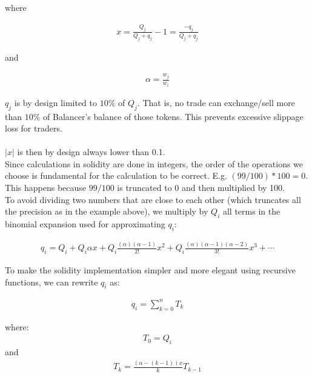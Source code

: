 \documentclass[11pt]{amsart}
\begin{document}
where 

\begin{equation}
\begin{gathered}
x = \frac{Q_j}{Q_j+q_j} - 1 = \frac{-q_j}{Q_j+q_j}
\end{gathered}
\end{equation}

and

\begin{equation}
\begin{gathered}
\alpha = \frac{w_j}{w_i}
\end{gathered}
\end{equation}

$q_j$ is by design limited to $10\%$ of $Q_j$. That is, no trade can exchange/sell more than $10\%$ of Balancer's balance of those tokens. This prevents excessive slippage loss for traders.
\\
\\
$|x|$ is then by design always lower than 0.1.
\\

Since calculations in solidity are done in integers, the order of the operations we choose is fundamental for the calculation to be correct. E.g. $(99/100)*100 = 0$. This happens because $99/100$ is truncated to 0 and then multiplied by 100.
\\

To avoid dividing two numbers that are close to each other (which truncates all the precision as in the example above), we multiply by $Q_i$ all terms in the binomial expansion used for approximating $q_i$:


\begin{equation}
\begin{gathered}
q_i=Q_i+Q_i\alpha x+
Q_i\frac{(\alpha)(\alpha-1)}{2!}x^2+
Q_i\frac{(\alpha)(\alpha-1)(\alpha-2)}{3!}x^3+
\cdots 
\end{gathered}
\end{equation}

To make the solidity implementation simpler and more elegant using recursive functions, we can rewrite $q_i$ as:

\begin{equation}
\begin{gathered}
q_i = \sum_{k=0}^{n}T_k
\end{gathered}
\end{equation}


where:
\begin{equation}
\begin{gathered}
T_0 = Q_i
\end{gathered}
\end{equation}
and
\begin{equation}
\begin{gathered}
T_k = \frac{\left(\alpha-(k-1)\right)x}{k} T_{k-1}
\end{gathered}
\end{equation}
\end{document}
